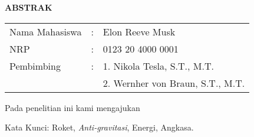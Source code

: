 \begin{center}
  \large\textbf{ABSTRAK}
\end{center}

\vspace{2ex}

\begingroup
  \setlength{\tabcolsep}{0pt}

  \noindent
  \begin{tabularx}{\textwidth}{l >{\centering}m{3em} X}
    Nama Mahasiswa  &:& Elon Reeve Musk \\
    NRP             &:&	0123 20 4000 0001 \\

    Pembimbing      &:& 1. Nikola Tesla, S.T., M.T. \\
                    & & 2. Wernher von Braun, S.T., M.T. \\
  \end{tabularx}
\endgroup

Pada penelitian ini kami mengajukan \lipsum[1]

Kata Kunci: Roket, \emph{Anti-gravitasi}, Energi, Angkasa.
